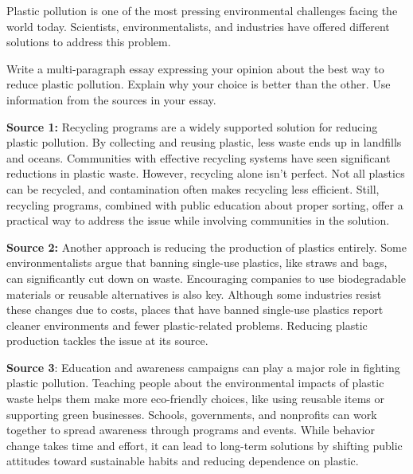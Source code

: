 \documentclass[12pt]{article}
\begin{document}
\begin{tcolorbox}[colframe=black!60, colback=white, 
coltitle=black, colbacktitle=black!15, fonttitle=\bfseries\Large, 
title=Independent Practice, halign title=center, left=10pt, right=10pt, top=10pt, bottom=15pt]
Plastic pollution is one of the most pressing environmental challenges facing the world today. Scientists, environmentalists, and industries have offered different solutions to address this problem. 

\vspace{1em}


Write a multi-paragraph essay expressing your opinion about the best way to reduce plastic pollution. Explain why your choice is better than the other. Use information from the sources in your essay.

\vspace{1em}


\textbf{Source 1:} Recycling programs are a widely supported solution for reducing plastic pollution. By collecting and reusing plastic, less waste ends up in landfills and oceans. Communities with effective recycling systems have seen significant reductions in plastic waste. However, recycling alone isn’t perfect. Not all plastics can be recycled, and contamination often makes recycling less efficient. Still, recycling programs, combined with public education about proper sorting, offer a practical way to address the issue while involving communities in the solution.

 


\vspace{1em}

\textbf{Source 2:} Another approach is reducing the production of plastics entirely. Some environmentalists argue that banning single-use plastics, like straws and bags, can significantly cut down on waste. Encouraging companies to use biodegradable materials or reusable alternatives is also key. Although some industries resist these changes due to costs, places that have banned single-use plastics report cleaner environments and fewer plastic-related problems. Reducing plastic production tackles the issue at its source.


\vspace{1em}


\textbf{Source 3}: Education and awareness campaigns can play a major role in fighting plastic pollution. Teaching people about the environmental impacts of plastic waste helps them make more eco-friendly choices, like using reusable items or supporting green businesses. Schools, governments, and nonprofits can work together to spread awareness through programs and events. While behavior change takes time and effort, it can lead to long-term solutions by shifting public attitudes toward sustainable habits and reducing dependence on plastic.

 


\end{tcolorbox}
\end{document}
